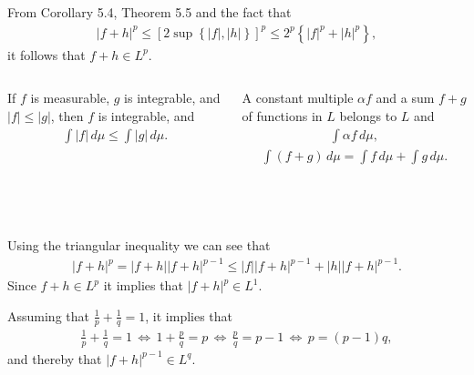 \documentclass{beamer}
\numberwithin{equation}{section}
\begin{document}
\begin{frame}\frametitle{{\normalsize \secname} \\ {\large \subsecname}}
    From Corollary 5.4, Theorem 5.5 and the fact that
    \begin{align}
        |f + h|^p \leq \left[2 \sup\left\{|f|, |h|\right\}\right]^p \leq 2^p\left\{|f|^p + |h|^p\right\},
    \end{align}
    it follows that $f + h \in L^p$.
    \begingroup
    \small
    \begin{columns}
        \begin{column}{0.4\textwidth}
            \begin{corollary}[5.4]
                If $f$ is measurable, $g$ is integrable, and $|f| \leq |g|$, then $f$ is integrable, and
                \begin{align}
                    \int |f| \, d\mu \leq \int |g| \, d\mu.
                \end{align}
            \end{corollary}
        \end{column}
        \begin{column}{0.6\textwidth}
            \begin{theorem}[5.5]
                A constant multiple $\alpha f$ and a sum $f + g$ of functions in $L$ belongs to $L$ and
                \begin{align}
                    \int \alpha f \, d\mu,
                \end{align}
                \begin{align}
                    \int (f + g) \, d\mu = \int f \, d\mu + \int g \, d\mu.
                \end{align}
            \end{theorem}
        \end{column}
    \end{columns}
    \endgroup
\end{frame}

\begin{frame}\frametitle{{\normalsize \secname} \\ {\large \subsecname}}
    Using the triangular inequality we can see that
    \begin{align}
        |f + h|^p = |f + h||f + h|^{p - 1} \leq |f||f + h|^{p - 1} + |h||f + h|^{p - 1}.
    \end{align}
    Since $f + h \in L^p$ it implies that $|f + h|^p \in L^1$.
    \vspace{1em}

    Assuming that $\frac{1}{p} + \frac{1}{q} = 1$, it implies that
    \begin{align}
        \frac{1}{p} + \frac{1}{q} = 1 \,    \Leftrightarrow \, 
        1 + \frac{p}{q} = p \,              \Leftrightarrow \,
        \frac{p}{q} = p - 1 \,              \Leftrightarrow \,
        p = (p - 1)q,
    \end{align}
    and thereby that $|f + h|^{p - 1} \in L^q$.
\end{frame}
\end{document}
